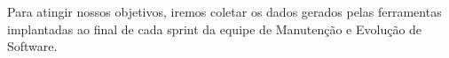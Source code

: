 

Para atingir nossos objetivos, iremos coletar os dados gerados pelas ferramentas
implantadas ao final de cada sprint da equipe de Manutenção e Evolução de Software.
